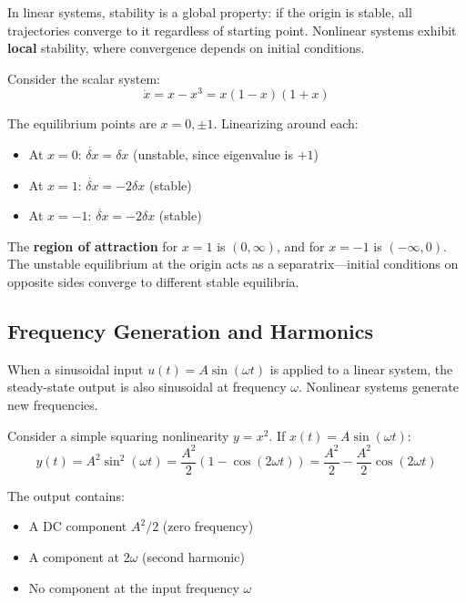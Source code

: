 In linear systems, stability is a global property: if the origin is stable, all trajectories converge to it regardless of starting point. Nonlinear systems exhibit \textbf{local} stability, where convergence depends on initial conditions.

\begin{example}
Consider the scalar system:
\begin{equation}
\dot{x} = x - x^3 = x(1-x)(1+x)
\end{equation}

The equilibrium points are $x = 0, \pm 1$. Linearizing around each:
\begin{itemize}
    \item At $x = 0$: $\dot{\delta x} = \delta x$ (unstable, since eigenvalue is $+1$)
    \item At $x = 1$: $\dot{\delta x} = -2\delta x$ (stable)
    \item At $x = -1$: $\dot{\delta x} = -2\delta x$ (stable)
\end{itemize}

The \textbf{region of attraction} for $x = 1$ is $(0, \infty)$, and for $x = -1$ is $(-\infty, 0)$. The unstable equilibrium at the origin acts as a separatrix---initial conditions on opposite sides converge to different stable equilibria.
\end{example}

\subsection{Frequency Generation and Harmonics}

When a sinusoidal input $u(t) = A\sin(\omega t)$ is applied to a linear system, the steady-state output is also sinusoidal at frequency $\omega$. Nonlinear systems generate new frequencies.

Consider a simple squaring nonlinearity $y = x^2$. If $x(t) = A\sin(\omega t)$:
\begin{equation}
y(t) = A^2 \sin^2(\omega t) = \frac{A^2}{2}(1 - \cos(2\omega t)) = \frac{A^2}{2} - \frac{A^2}{2}\cos(2\omega t)
\end{equation}

The output contains:
\begin{itemize}
    \item A DC component $A^2/2$ (zero frequency)
    \item A component at $2\omega$ (second harmonic)
    \item No component at the input frequency $\omega$
\end{itemize}


